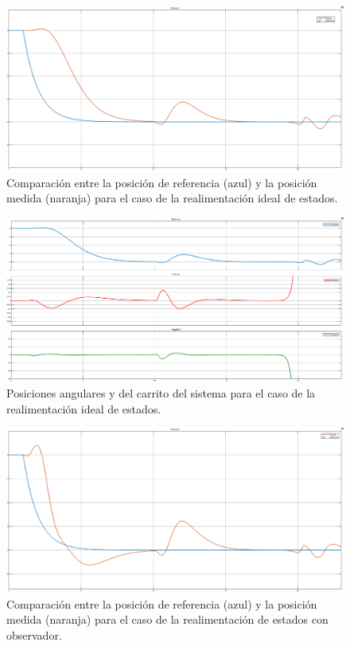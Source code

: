 %
%
%

\begin{figure}[H]
	\centering
	\includegraphics[width=\linewidth]{../Analisis de Resultados/ImagenesAnalisis de Resultados/realim_posref.png}
	\caption{Comparación entre la posición de referencia (azul) y la posición medida (naranja) para el caso de la realimentación ideal de estados.}	
	\label{fig:realim_posref}
\end{figure}

\begin{figure}[H]
	\centering
	\includegraphics[width=\linewidth]{../Analisis de Resultados/ImagenesAnalisis de Resultados/realim_vars.png}
	\caption{Posiciones angulares y del carrito del sistema para el caso de la realimentación ideal de estados.}	
	\label{fig:realim_vars}
\end{figure}


\begin{figure}[H]
	\centering
	\includegraphics[width=\linewidth]{../Analisis de Resultados/ImagenesAnalisis de Resultados/obsv_posref.png}
	\caption{Comparación entre la posición de referencia (azul) y la posición medida (naranja) para el caso de la realimentación de estados con observador.}	
	\label{fig:obsv_posref}
\end{figure}

